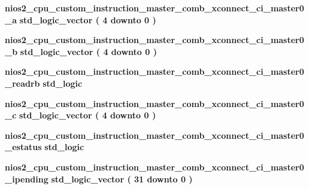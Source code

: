 \begin{DoxyCompactItemize}
\item 
{\bf nios2\+\_\+cpu\+\_\+custom\+\_\+instruction\+\_\+master\+\_\+comb\+\_\+xconnect\+\_\+ci\+\_\+master0\+\_\+a} {\bfseries \textcolor{comment}{std\+\_\+logic\+\_\+vector}\textcolor{vhdlchar}{ }\textcolor{vhdlchar}{(}\textcolor{vhdlchar}{ }\textcolor{vhdlchar}{ } \textcolor{vhdldigit}{4} \textcolor{vhdlchar}{ }\textcolor{keywordflow}{downto}\textcolor{vhdlchar}{ }\textcolor{vhdlchar}{ } \textcolor{vhdldigit}{0} \textcolor{vhdlchar}{ }\textcolor{vhdlchar}{)}\textcolor{vhdlchar}{ }} 
\item 
{\bf nios2\+\_\+cpu\+\_\+custom\+\_\+instruction\+\_\+master\+\_\+comb\+\_\+xconnect\+\_\+ci\+\_\+master0\+\_\+b} {\bfseries \textcolor{comment}{std\+\_\+logic\+\_\+vector}\textcolor{vhdlchar}{ }\textcolor{vhdlchar}{(}\textcolor{vhdlchar}{ }\textcolor{vhdlchar}{ } \textcolor{vhdldigit}{4} \textcolor{vhdlchar}{ }\textcolor{keywordflow}{downto}\textcolor{vhdlchar}{ }\textcolor{vhdlchar}{ } \textcolor{vhdldigit}{0} \textcolor{vhdlchar}{ }\textcolor{vhdlchar}{)}\textcolor{vhdlchar}{ }} 
\item 
{\bf nios2\+\_\+cpu\+\_\+custom\+\_\+instruction\+\_\+master\+\_\+comb\+\_\+xconnect\+\_\+ci\+\_\+master0\+\_\+readrb} {\bfseries \textcolor{comment}{std\+\_\+logic}\textcolor{vhdlchar}{ }} 
\item 
{\bf nios2\+\_\+cpu\+\_\+custom\+\_\+instruction\+\_\+master\+\_\+comb\+\_\+xconnect\+\_\+ci\+\_\+master0\+\_\+c} {\bfseries \textcolor{comment}{std\+\_\+logic\+\_\+vector}\textcolor{vhdlchar}{ }\textcolor{vhdlchar}{(}\textcolor{vhdlchar}{ }\textcolor{vhdlchar}{ } \textcolor{vhdldigit}{4} \textcolor{vhdlchar}{ }\textcolor{keywordflow}{downto}\textcolor{vhdlchar}{ }\textcolor{vhdlchar}{ } \textcolor{vhdldigit}{0} \textcolor{vhdlchar}{ }\textcolor{vhdlchar}{)}\textcolor{vhdlchar}{ }} 
\item 
{\bf nios2\+\_\+cpu\+\_\+custom\+\_\+instruction\+\_\+master\+\_\+comb\+\_\+xconnect\+\_\+ci\+\_\+master0\+\_\+estatus} {\bfseries \textcolor{comment}{std\+\_\+logic}\textcolor{vhdlchar}{ }} 
\item 
{\bf nios2\+\_\+cpu\+\_\+custom\+\_\+instruction\+\_\+master\+\_\+comb\+\_\+xconnect\+\_\+ci\+\_\+master0\+\_\+ipending} {\bfseries \textcolor{comment}{std\+\_\+logic\+\_\+vector}\textcolor{vhdlchar}{ }\textcolor{vhdlchar}{(}\textcolor{vhdlchar}{ }\textcolor{vhdlchar}{ } \textcolor{vhdldigit}{31} \textcolor{vhdlchar}{ }\textcolor{keywordflow}{downto}\textcolor{vhdlchar}{ }\textcolor{vhdlchar}{ } \textcolor{vhdldigit}{0} \textcolor{vhdlchar}{ }\textcolor{vhdlchar}{)}\textcolor{vhdlchar}{ }} 

\end{DoxyCompactItemize}

